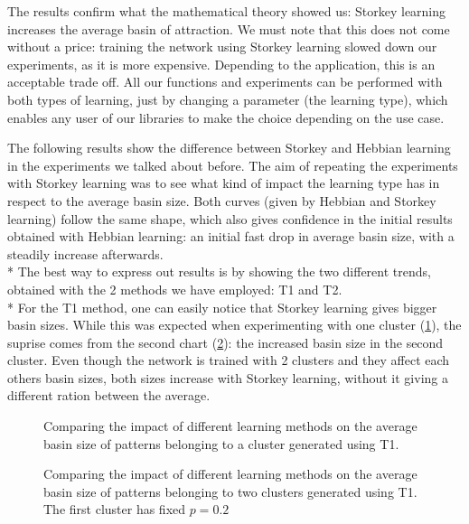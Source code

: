 The results confirm what the mathematical theory showed us: Storkey learning
increases the average basin of attraction. We must note that this does not
come without a price: training the network using Storkey learning slowed down
our experiments, as it is more expensive. Depending to the application, this
is an acceptable trade off. All our functions and experiments can be performed
with both types of learning, just by changing a parameter (the learning type),
which enables any user of our libraries to make the choice depending on the
use case.

The following results show the difference between Storkey and Hebbian learning in the experiments we talked about before. 
The aim of repeating the experiments with Storkey learning was to see what kind of impact the learning type has in respect to the average basin size.
Both curves (given by Hebbian and Storkey learning) follow the same shape, which also gives confidence in the initial results obtained with Hebbian learning: an initial fast drop in
average basin size, with a steadily increase afterwards. 
\\*
The best way to express out results is by showing the two different trends, obtained with the 2 methods we have employed: T1 and T2.
\\*
For the T1 method, one can easily notice that Storkey learning gives bigger basin sizes. While this was expected when experimenting with one cluster 
 (\ref{fig:plot-storkey-T1-onecluster}), the suprise comes from the second chart (\ref{fig:plot-storkey-T1-twoclusters}): the  increased basin size in the second cluster. Even though the network is trained with 2 clusters 
and they affect each others basin sizes, both sizes increase with Storkey learning, without it giving a different ration between the average.


\begin{figure}[h]
  \centering
  
\caption{Comparing the impact of different learning methods on the average basin size of patterns belonging to a cluster generated using T1.}
\label{fig:plot-storkey-T1-onecluster}
\end{figure}

\begin{figure}[h]
  \centering
  
\caption{Comparing the impact of different learning methods on the average basin size of patterns belonging to two clusters generated using T1. The first cluster has fixed $p = 0.2$}
\label{fig:plot-storkey-T1-twoclusters}
\end{figure}


